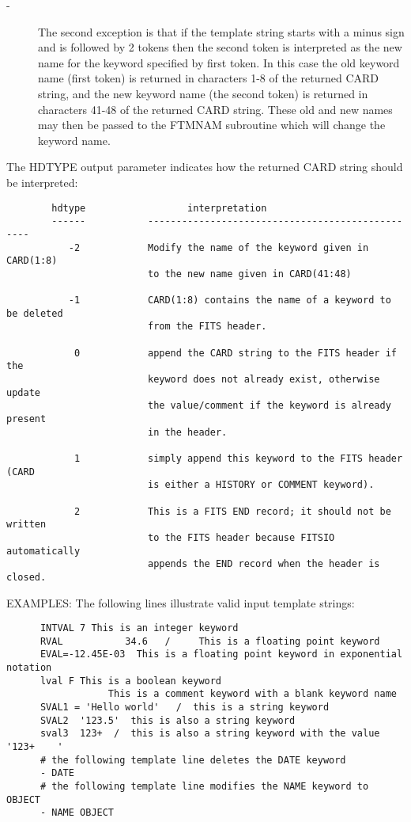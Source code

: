 \documentclass[11pt]{book}
\begin{document}
\begin{description}
\item[- ]     The second exception is that if the template string starts with
        a minus sign and is followed by 2 tokens then the second token
        is interpreted as the new name for the keyword specified by
        first token.  In this case the old keyword name (first token)
        is returned in characters 1-8 of the returned CARD string, and
        the new keyword name (the second token) is returned in characters
        41-48 of the returned CARD string.  These old and new names
        may then be passed to the FTMNAM subroutine which will change
       the keyword name.
\end{description}

    The HDTYPE output parameter indicates how the returned CARD string
    should be interpreted:

\begin{verbatim}
        hdtype                  interpretation
        ------           -------------------------------------------------
           -2            Modify the name of the keyword given in CARD(1:8)
                         to the new name given in CARD(41:48)

           -1            CARD(1:8) contains the name of a keyword to be deleted
                         from the FITS header.

            0            append the CARD string to the FITS header if the
                         keyword does not already exist, otherwise update
                         the value/comment if the keyword is already present
                         in the header.

            1            simply append this keyword to the FITS header (CARD
                         is either a HISTORY or COMMENT keyword).

            2            This is a FITS END record; it should not be written
                         to the FITS header because FITSIO automatically
                         appends the END record when the header is closed.
\end{verbatim}
     EXAMPLES:  The following lines illustrate valid input template strings:

\begin{verbatim}
      INTVAL 7 This is an integer keyword
      RVAL           34.6   /     This is a floating point keyword
      EVAL=-12.45E-03  This is a floating point keyword in exponential notation
      lval F This is a boolean keyword
                  This is a comment keyword with a blank keyword name
      SVAL1 = 'Hello world'   /  this is a string keyword
      SVAL2  '123.5'  this is also a string keyword
      sval3  123+  /  this is also a string keyword with the value '123+    '
      # the following template line deletes the DATE keyword
      - DATE
      # the following template line modifies the NAME keyword to OBJECT
      - NAME OBJECT
\end{verbatim}
\end{document}
